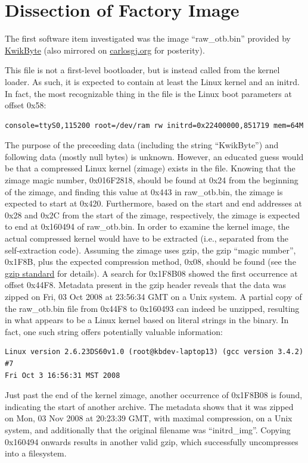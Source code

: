 \documentclass[]{article}
\begin{document}
\section{Dissection of Factory Image}
\par The first software item investigated was the image ``raw\_otb.bin'' provided by \href{http://www.kwikbyte.com/driverstation/binary/raw_otb.bin}{KwikByte} (also mirrored on \href{http://carlosgj.org/FRC/DS9260/raw_otb.bin}{carlosgj.org} for posterity).
\par This file is not a first-level bootloader, but is instead called from the kernel loader. As such, it is expected to contain at least the Linux kernel and an initrd. In fact, the most recognizable thing in the file is the Linux boot parameters at offset 0x58:
\begin{verbatim}
console=ttyS0,115200 root=/dev/ram rw initrd=0x22400000,851719 mem=64M
\end{verbatim}
\par The purpose of the preceeding data (including the string ``KwikByte'') and following data (mostly null bytes) is unknown. However, an educated guess would be that a compressed Linux kernel (zimage) exists in the file. Knowing that the zimage magic number, 0x016F2818, should be found at 0x24 from the beginning of the zimage, and finding this value at 0x443 in raw\_otb.bin, the zimage is expected to start at 0x420. Furthermore, based on the start and end addresses at 0x28 and 0x2C from the start of the zimage, respectively, the zimage is expected to end at 0x160494 of raw\_otb.bin. In order to examine the kernel image, the actual compressed kernel would have to be extracted (i.e., separated from the self-extraction code). Assuming the zimage uses gzip, the gzip ``magic number'', 0x1F8B, plus the expected compression method, 0x08, should be found (see the \href{https://tools.ietf.org/html/rfc1952}{gzip standard} for details). A search for 0x1F8B08 showed the first occurrence at offset 0x44F8. Metadata present in the gzip header reveals that the data was zipped on Fri, 03 Oct 2008 at 23:56:34 GMT on a Unix system. A partial copy of the raw\_otb.bin file from 0x44F8 to 0x160493 can indeed be unzipped, resulting in what appears to be a Linux kernel based on literal strings in the binary. In fact, one such string offers potentially valuable information:
\begin{verbatim}
Linux version 2.6.23DS60v1.0 (root@kbdev-laptop13) (gcc version 3.4.2) #7 
Fri Oct 3 16:56:31 MST 2008
\end{verbatim}
\par Just past the end of the kernel zimage, another occurrence of 0x1F8B08 is found, indicating the start of another archive. The metadata shows that it was zipped on Mon, 03 Nov 2008 at 20:23:39 GMT, with maximal compression, on a Unix system, and additionally that the original filename was ``initrd\_img''. Copying 0x160494 onwards results in another valid gzip, which successfully uncompresses into a filesystem.
\end{document}
